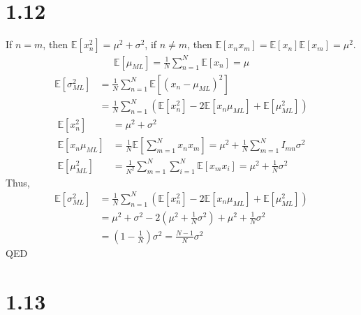 \documentclass[10pt,a4paper,draft]{book}
\begin{document}
\section*{1.12}
If $n=m$, then $\mathbb{E}[x_n^2] = \mu^2 + \sigma^2$, if $n\neq m$, then $\mathbb{E}[x_nx_m] = \mathbb{E}[x_n]\mathbb{E}[x_m] = \mu^2$.
\begin{equation}
\begin{aligned}
\mathbb{E}[\mu_{ML}] = \frac{1}{N}\sum_{n=1}^{N}\mathbb{E}[x_n] = \mu
\end{aligned}
\end{equation}
\begin{equation}
\begin{aligned}
\mathbb{E}[\sigma^2_{ML}] &= \frac{1}{N}\sum_{n=1}^{N}\mathbb{E}[(x_n-\mu_{ML})^2] \\
&= \frac{1}{N}\sum_{n=1}^{N}(\mathbb{E}[x_n^2] - 2 \mathbb{E}[x_n\mu_{ML}]+\mathbb{E}[\mu_{ML}^2])
\end{aligned}
\end{equation}
\begin{equation}
\begin{aligned}
\mathbb{E}[x_n^2] &= \mu^2 + \sigma^2 \\
\mathbb{E}[x_n\mu_{ML}] &= \frac{1}{N}\mathbb{E}[\sum_{m=1}^{N}x_nx_m] = \mu^2 + \frac{1}{N}\sum_{m=1}^{N} I_{mn}\sigma^2 \\
\mathbb{E}[\mu_{ML}^2] &= \frac{1}{N^2}\sum_{m=1}^{N}\sum_{i=1}^{N} \mathbb{E}[x_mx_i] = \mu^2 + \frac{1}{N}\sigma^2
\end{aligned}
\end{equation}
Thus,
\begin{equation}
\begin{aligned}
\mathbb{E}[\sigma^2_{ML}] &= \frac{1}{N}\sum_{n=1}^{N}(\mathbb{E}[x_n^2] - 2 \mathbb{E}[x_n\mu_{ML}]+\mathbb{E}[\mu_{ML}^2]) \\
&= \mu^2+\sigma^2 - 2(\mu^2 + \frac{1}{N}\sigma^2) + \mu^2 + \frac{1}{N}\sigma^2 \\
&= (1-\frac{1}{N})\sigma^2 = \frac{N-1}{N}\sigma^2
\end{aligned}
\end{equation}
QED

\section*{1.13}
\end{document}
